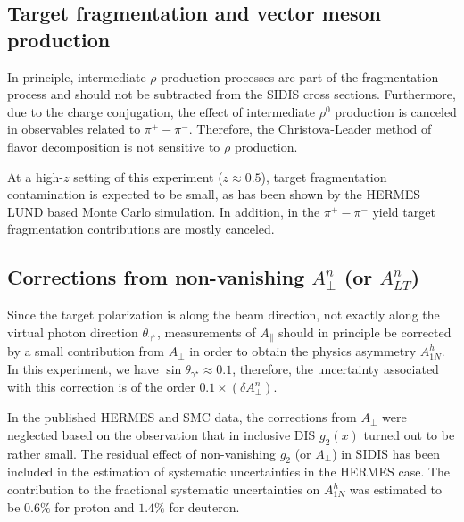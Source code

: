 \subsection{Target fragmentation and vector meson production }
 In principle, intermediate $\rho$ production processes are part
 of the fragmentation process and should not be subtracted
 from the SIDIS cross sections. Furthermore, 
 due to the charge conjugation, the effect of intermediate
 $\rho^0$ production is canceled in observables related to
 $\pi^+ - \pi^-$. Therefore, the Christova-Leader method of flavor decomposition
 is not sensitive to $\rho$ production.  

 At a high-$z$ setting of this experiment ($z \approx 0.5$), target fragmentation contamination is 
expected to be small, as has been shown by the HERMES LUND based Monte Carlo simulation. In addition, in the
$\pi^+ - \pi^-$ yield target fragmentation contributions are mostly canceled.


\subsection{Corrections from non-vanishing $A^n_{\perp}$ (or $A^n_{LT}$) }   
Since the target polarization is along the beam direction, not exactly along the
virtual photon  direction $\theta_{\gamma^{\star}}$, measurements of
$A_{\parallel}$ should in principle be corrected by a small contribution from $A_{\perp}$
in order to obtain the physics asymmetry $A_{1N}^h$.  
In this experiment, we have  $\sin \theta_{\gamma^{\star}} \approx 0.1$, therefore,
the uncertainty associated with this correction is of the order $0.1 \times (\delta A^n_{\perp})$. 

In the published HERMES and SMC data, the corrections from $A_{\perp}$ were neglected based on
the observation that in inclusive DIS $g_2(x)$ turned out to be rather small.  The residual
effect of non-vanishing $g_2$ (or $A_{\perp}$) in SIDIS has been included in the 
estimation of systematic uncertainties in the HERMES case. The contribution to the fractional 
systematic uncertainties on $A_{1N}^h$ was estimated to be $0.6 \%$ for proton and 
$1.4 \%$ for deuteron.



